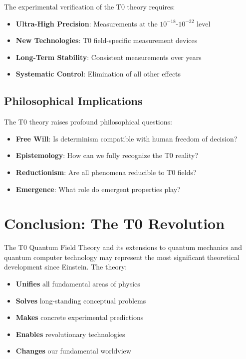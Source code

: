 \documentclass[12pt,a4paper]{article}
\begin{document}
	The experimental verification of the T0 theory requires:
	
	\begin{itemize}
		\item \textbf{Ultra-High Precision}: Measurements at the $10^{-18}$-$10^{-32}$ level
		\item \textbf{New Technologies}: T0 field-specific measurement devices
		\item \textbf{Long-Term Stability}: Consistent measurements over years
		\item \textbf{Systematic Control}: Elimination of all other effects
	\end{itemize}
	
	\subsection{Philosophical Implications}
	
	The T0 theory raises profound philosophical questions:
	
	\begin{itemize}
		\item \textbf{Free Will}: Is determinism compatible with human freedom of decision?
		\item \textbf{Epistemology}: How can we fully recognize the T0 reality?
		\item \textbf{Reductionism}: Are all phenomena reducible to T0 fields?
		\item \textbf{Emergence}: What role do emergent properties play?
	\end{itemize}
	
	\section{Conclusion: The T0 Revolution}
	
	The T0 Quantum Field Theory and its extensions to quantum mechanics and quantum computer technology may represent the most significant theoretical development since Einstein. The theory:
	
	\begin{itemize}
		\item \textbf{Unifies} all fundamental areas of physics
		\item \textbf{Solves} long-standing conceptual problems
		\item \textbf{Makes} concrete experimental predictions
		\item \textbf{Enables} revolutionary technologies
		\item \textbf{Changes} our fundamental worldview
	\end{itemize}
	
\end{document}
